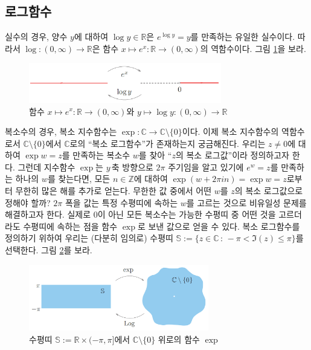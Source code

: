 \subsection{로그함수}

실수의 경우,
양수 $y$에 대하여 $\log y\in \mathbb R$은
$e^{\log y} = y$를 만족하는 유일한 실수이다.
따라서 $\log : (0,\infty) \to \mathbb R$은 
함수 $x\mapsto e^x: \mathbb R \to (0,\infty)$의 역함수이다.
그림 \ref{fig-1-18}을 보라.

\begin{figure}[!h]
\begin{center}
\includegraphics[width=0.75\textwidth]{./SaltChapter/figs/fig-1-18}
\end{center}
\caption{함수 $x\mapsto e^x : \mathbb R \to (0,\infty)$와
$y\mapsto \log y : (0,\infty) \to \mathbb R$}
\label{fig-1-18}
\end{figure}

복소수의 경우,
복소 지수함수는 $\exp: \mathbb C \to \mathbb C\setminus \{0\}$이다.
이제 복소 지수함수의 역함수로서 $\mathbb C\setminus \{0\}$에서 $\mathbb C$로의
``복소 로그함수''가 존재하는지 궁금해진다.
우리는 $z\ne0$에 대하여 $\exp w = z$를 만족하는 복소수 $w$를 찾아
``$z$의 복소 로그값''이라 정의하고자 한다.
그런데  지수함수 $\exp$는 $y\,$축 방향으로 $2\pi$ 주기임을 알고 있기에
$e^w =z$를 만족하는 하나의 $w$를 찾는다면,
모든 $n\in\mathbb Z$에 대하여 $\exp(w+2\pi i n) = \exp w = z$로부터
무한히 많은 해를 추가로 얻는다.
무한한 값 중에서 어떤 $w$를 $z$의 복소 로그값으로 정해야 할까?
$2\pi$ 폭을 값는 특정 수평띠에 속하는
$w$를 고르는 것으로 비유일성 문제를  해결하고자 한다.
실제로 $0$이 아닌 모든 복소수는 
가능한 수평띠 중 어떤 것을 고르더라도 
수평띠에 속하는 점을 함수 $\exp$로 보낸 값으로 얻을 수 있다.
복소 로그함수를 정의하기 위하여
우리는 (다분히 임의로) 수평띠 $\mathbb S := \{ z\in\mathbb C\,:\, -\pi < \Im(z) \le \pi\}$를
선택한다. 그림  \ref{fig-1-19}를 보라.

\begin{figure}[!h]
\begin{center}
\includegraphics[width=0.7\textwidth]{./SaltChapter/figs/fig-1-19}
\end{center}
\caption{수평띠 $\mathbb S := \mathbb R \times (-\pi, \pi]$에서
$\mathbb C\setminus \{0\}$ 위로의 함수 $\exp$}
\label{fig-1-19}
\end{figure}


